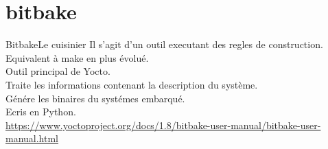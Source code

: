 \section{bitbake}

\begin{frame}{Bitbake}{Le cuisinier}
	Il s'agit d'un outil executant des regles de construction.\\
	Equivalent à make en plus évolué.\\
	Outil principal de Yocto.\\
	Traite les informations contenant la description du système.\\
	Génére les binaires du systémes embarqué.\\
	Ecris en Python.\\
	\url{https://www.yoctoproject.org/docs/1.8/bitbake-user-manual/bitbake-user-manual.html}
\end{frame}
